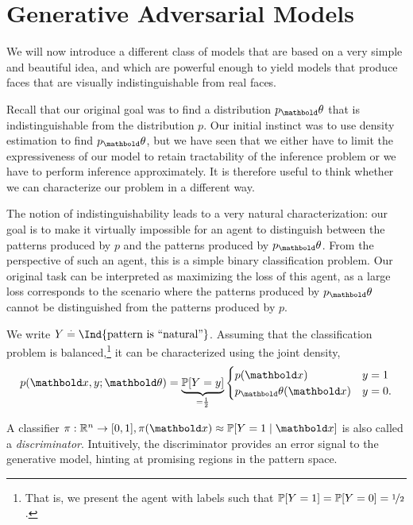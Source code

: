 \documentclass{tufte-handout}
\begin{document}
\section{Generative Adversarial Models}

We will now introduce a different class of models that are based on a very simple and beautiful idea, and which are powerful enough to yield models that produce faces that are visually indistinguishable from real faces.

Recall that our original goal was to find a distribution $p_\vtheta$ that is indistinguishable from the distribution $p$. Our initial instinct was to use density estimation to find $p_\vtheta$, but we have seen that we either have to limit the expressiveness of our model to retain tractability of the inference problem or we have to perform inference approximately. It is therefore useful to think whether we can characterize our problem in a different way.

The notion of indistinguishability leads to a very natural characterization: our goal is to make it virtually impossible for an agent to distinguish between the patterns produced by $p$ and the patterns produced by $p_\vtheta$. From the perspective of such an agent, this is a simple binary classification problem. Our original task can be interpreted as maximizing the loss of this agent, as a large loss corresponds to the scenario where the patterns produced by $p_\vtheta$ cannot be distinguished from the patterns produced by $p$.

We write $Y \defeq \Ind{\text{pattern is ``natural''}}$. Assuming that the classification problem is balanced,\footnote{That is, we present the agent with labels such that $\Pr{Y=1} = \Pr{Y=0} = \nicefrac{1}{2}$.} it can be characterized using the joint density, \begin{align}
    p(\vx, y; \vtheta) = \underbrace{\Pr{Y = y}}_{=\frac{1}{2}}\begin{cases}
        p(\vx) & y = 1 \\
        p_\vtheta(\vx) & y = 0.
    \end{cases}
\end{align}

A classifier $\pi: \R^n \to [0,1], \pi(\vx) \approx \Pr{Y = 1 \mid \vx}$ is also called a \emph{discriminator}. Intuitively, the discriminator provides an error signal to the generative model, hinting at promising regions in the pattern space.
\end{document}
